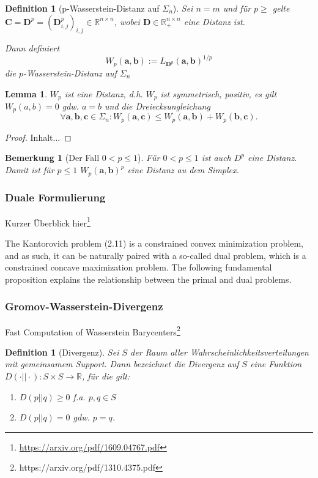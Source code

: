 \documentclass[twoside, 11pt,a4paper]{article}
\newtheorem{lemma}[theorem]{Lemma}
\newtheorem{definition}[theorem]{Definition}
\newtheorem{remark}[theorem]{Bemerkung}
\numberwithin{equation}{section}
\begin{document}
	\begin{definition}[p-Wasserstein-Distanz auf $\Sigma_n$]
		Sei $n=m$ und für $p \geq$ gelte $\boldsymbol{C} = \boldsymbol{D}^p = (\boldsymbol{D}_{i,j}^p)_{i,j} \in \mathbb{R}^{n \times n}$, wobei $\boldsymbol{D} \in \mathbb{R}_+^{n \times n}$ eine Distanz ist.
		
		Dann definiert 
		\begin{equation}
		W_p(\boldsymbol{a}, \boldsymbol{b}) := L_{\boldsymbol{D}^p} (\boldsymbol{a}, \boldsymbol{b})^{1/p}
		\end{equation} 
		die $p$-Wasserstein-Distanz auf $\Sigma_n$
	\end{definition}
	
	\begin{lemma}
		$W_p$ ist eine Distanz, d.h. $W_p$ ist symmetrisch, positiv, es gilt $W_p(a,b) = 0$ gdw. $a = b$ und die Dreiecksungleichung
		\begin{equation}
		\forall \boldsymbol{a}, \boldsymbol{b}, \boldsymbol{c} \in \Sigma_n : W_p(\boldsymbol{a}, \boldsymbol{c}) \leq W_p(\boldsymbol{a}, \boldsymbol{b}) + W_p(\boldsymbol{b}, \boldsymbol{c}).
		\end{equation}
	\end{lemma}
	
	\begin{proof}
		Inhalt...
	\end{proof}
	
	\begin{remark}[Der Fall $0 < p \leq 1$]
		Für $0 < p \leq 1$ ist auch $D^p$ eine Distanz. Damit ist für $ p \leq 1$ $W_p(\boldsymbol{a}, \boldsymbol{b})^p$ eine Distanz au dem Simplex.
		
	\end{remark}
	\subsubsection{Duale Formulierung}
	Kurzer Überblick hier\footnote{\url{https://arxiv.org/pdf/1609.04767.pdf}}
	
	The Kantorovich problem (2.11) is a constrained convex minimization problem, and as
	such, it can be naturally paired with a so-called dual problem, which is a constrained
	concave maximization problem. The following fundamental proposition explains the
	relationship between the primal and dual problems.
	\subsubsection{Gromov-Wasserstein-Divergenz}
	Fast Computation of Wasserstein Barycenters\footnote{https://arxiv.org/pdf/1310.4375.pdf}
	\begin{definition}[Divergenz]
		Sei $S$ der Raum aller Wahrscheinlichkeitsverteilungen mit gemeinsamem Support. Dann bezeichnet die Divergenz auf $S$ eine Funktion $D(\cdot || \cdot):S \times S \to \mathbb{R}$, für die gilt:
		\begin{enumerate}
			\item $D(p || q) \geq 0$ f.a. $p,q \in S$\\
			\item $D(p || q) = 0$ gdw. $p = q$.
		\end{enumerate}
	\end{definition}
	
\end{document}
